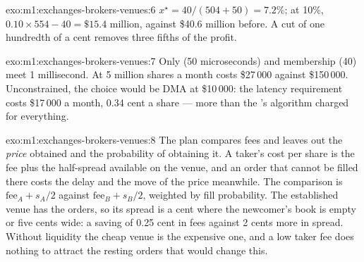 \begin{solution}{exo:m1:exchanges-brokers-venues:6}
$x^\star = 40/(504+50) = 7.2\%$; at 10\%, $0.10 \times 554 - 40 = \$15.4$
million, against \$40.6 million before. A cut of one hundredth of a cent
removes three fifths of the profit.
\end{solution}

\begin{solution}{exo:m1:exchanges-brokers-venues:7}
Only  (50 microseconds) and membership (40) meet 1
millisecond. At 5 million shares a month  costs \$27\,000
against \$150\,000. Unconstrained, the choice would be DMA at \$10\,000: the
latency requirement costs \$17\,000 a month, 0.34 cent a share --- more than
the 's algorithm charged for everything.
\end{solution}

\begin{solution}{exo:m1:exchanges-brokers-venues:8}
The plan compares fees and leaves out the \emph{price} obtained and the
probability of obtaining it. A taker's cost per share is the fee plus the
half-spread available on the venue, and an order that cannot be filled there
costs the delay and the move of the price meanwhile. The comparison is
$\text{fee}_A + s_A/2$ against $\text{fee}_B + s_B/2$, weighted by fill
probability. The established venue has the orders, so its spread is a cent
where the newcomer's book is empty or five cents wide: a saving of 0.25 cent
in fees against 2 cents more in spread. Without liquidity the cheap venue is
the expensive one, and a low taker fee does nothing to attract the resting
orders that would change this.
\end{solution}

